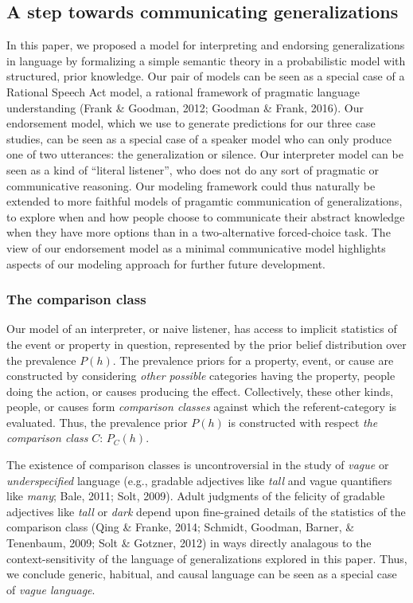 \documentclass[english,floatsintext,man]{apa6}
\theoremstyle{definition}
\theoremstyle{definition}
\theoremstyle{definition}
\theoremstyle{remark}
\begin{document}
\subsection{A step towards communicating
generalizations}\label{a-step-towards-communicating-generalizations}

In this paper, we proposed a model for interpreting and endorsing
generalizations in language by formalizing a simple semantic theory in a
probabilistic model with structured, prior knowledge. Our pair of models
can be seen as a special case of a Rational Speech Act model, a rational
framework of pragmatic language understanding (Frank \& Goodman, 2012;
Goodman \& Frank, 2016). Our endorsement model, which we use to generate
predictions for our three case studies, can be seen as a special case of
a speaker model who can only produce one of two utterances: the
generalization or silence. Our interpreter model can be seen as a kind
of \enquote{literal listener}, who does not do any sort of pragmatic or
communicative reasoning. Our modeling framework could thus naturally be
extended to more faithful models of pragamtic communication of
generalizations, to explore when and how people choose to communicate
their abstract knowledge when they have more options than in a
two-alternative forced-choice task. The view of our endorsement model as
a minimal communicative model highlights aspects of our modeling
approach for further future development.

\subsubsection{The comparison class}\label{the-comparison-class}

Our model of an interpreter, or naive listener, has access to implicit
statistics of the event or property in question, represented by the
prior belief distribution over the prevalence \(P(h)\). The prevalence
priors for a property, event, or cause are constructed by considering
\emph{other possible} categories having the property, people doing the
action, or causes producing the effect. Collectively, these other kinds,
people, or causes form \emph{comparison classes} against which the
referent-category is evaluated. Thus, the prevalence prior \(P(h)\) is
constructed with respect \emph{the comparison class} \(C\): \(P_C(h)\).

The existence of comparison classes is uncontroversial in the study of
\emph{vague} or \emph{underspecified} language (e.g., gradable
adjectives like \emph{tall} and vague quantifiers like \emph{many};
Bale, 2011; Solt, 2009). Adult judgments of the felicity of gradable
adjectives like \emph{tall} or \emph{dark} depend upon fine-grained
details of the statistics of the comparison class (Qing \& Franke, 2014;
Schmidt, Goodman, Barner, \& Tenenbaum, 2009; Solt \& Gotzner, 2012) in
ways directly analagous to the context-sensitivity of the language of
generalizations explored in this paper. Thus, we conclude generic,
habitual, and causal language can be seen as a special case of
\emph{vague language}.
\end{document}
